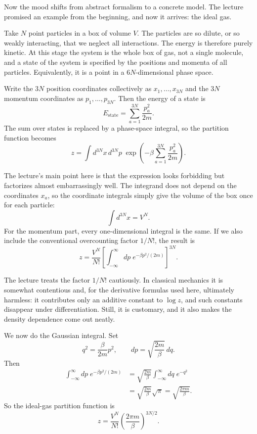 Now the mood shifts from abstract formalism to a concrete model. The lecture promised an example from the beginning, and now it arrives: the ideal gas.

Take \(N\) point particles in a box of volume \(V\). The particles are so dilute, or so weakly interacting, that we neglect all interactions. The energy is therefore purely kinetic. At this stage the system is the whole box of gas, not a single molecule, and a state of the system is specified by the positions and momenta of all particles. Equivalently, it is a point in a \(6N\)-dimensional phase space.

Write the \(3N\) position coordinates collectively as \(x_1,\dots,x_{3N}\) and the \(3N\) momentum coordinates as \(p_1,\dots,p_{3N}\). Then the energy of a state is
\begin{equation}
E_{\mathrm{state}}=\sum_{a=1}^{3N}\frac{p_a^2}{2m}.
\end{equation}
The sum over states is replaced by a phase-space integral, so the partition function becomes
\begin{equation}
z
=
\int d^{3N}x\,d^{3N}p\;
\exp\!\left(-\beta \sum_{a=1}^{3N}\frac{p_a^2}{2m}\right).
\end{equation}

The lecture's main point here is that the expression looks forbidding but factorizes almost embarrassingly well. The integrand does not depend on the coordinates \(x_a\), so the coordinate integrals simply give the volume of the box once for each particle:
\begin{equation}
\int d^{3N}x = V^N.
\end{equation}
For the momentum part, every one-dimensional integral is the same. If we also include the conventional overcounting factor \(1/N!\), the result is
\begin{equation}
z=\frac{V^N}{N!}\left[\int_{-\infty}^{\infty}dp\;e^{-\beta p^2/(2m)}\right]^{3N}.
\end{equation}

The lecture treats the factor \(1/N!\) cautiously. In classical mechanics it is somewhat contentious and, for the derivative formulas used here, ultimately harmless: it contributes only an additive constant to \(\log z\), and such constants disappear under differentiation. Still, it is customary, and it also makes the density dependence come out neatly.

We now do the Gaussian integral. Set
\begin{equation}
q^2=\frac{\beta}{2m}p^2,
\qquad
dp=\sqrt{\frac{2m}{\beta}}\,dq.
\end{equation}
Then
\begin{align}
\int_{-\infty}^{\infty}dp\;e^{-\beta p^2/(2m)}
&=
\sqrt{\frac{2m}{\beta}}
\int_{-\infty}^{\infty}dq\;e^{-q^2} \\
&=
\sqrt{\frac{2m}{\beta}}\sqrt{\pi}
=
\sqrt{\frac{2\pi m}{\beta}}.
\end{align}
So the ideal-gas partition function is
\begin{equation}
z=\frac{V^N}{N!}\left(\frac{2\pi m}{\beta}\right)^{3N/2}.
\end{equation}

